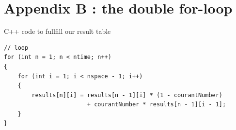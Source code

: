 \documentclass{report}
\begin{document}
                \section{Appendix B : the double for-loop}

                C++ code to fullfill our result table
                    \begin{verbatim}
// loop
for (int n = 1; n < ntime; n++)
{
    for (int i = 1; i < nspace - 1; i++)
    {
        results[n][i] = results[n - 1][i] * (1 - courantNumber) 
                        + courantNumber * results[n - 1][i - 1];
    }
}
                    \end{verbatim}

        
\end{document}

